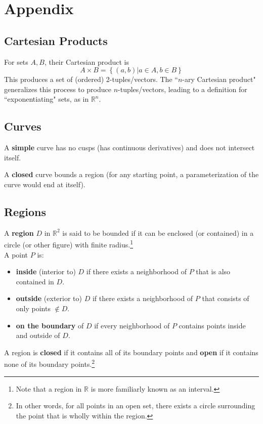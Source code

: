\documentclass{article}
\begin{document}
\section{Appendix}
\subsection{Cartesian Products} \label{set-multiplication}
For sets $A, B$, their Cartesian product is $$A \times B = \left\{ (a,b) | a \in A, b \in B\right\}$$
This produces a set of (ordered) 2-tuples/vectors.
The ``$n$-ary Cartesian product" generalizes this process to produce $n$-tuples/vectors, leading to a definition for ``exponentiating" sets, as in $\mathbb{R}^n$.

\subsection{Curves}
A \textbf{simple} curve has no cusps (has continuous derivatives) and does not intersect itself.

A \textbf{closed} curve bounds a region (for any starting point, a parameterization of the curve would end at itself).

\subsection{Regions} \label{regions}
A \textbf{region} $D$ in $\mathbb{R}^2$ is said to be bounded if it can be enclosed (or contained) in a circle (or other figure) with finite radius.\footnote{Note that a region in $\mathbb{R}$ is more familiarly known as an interval.}\\
A point $P$ is:
\begin{itemize}
    \item \textbf{inside} (interior to) $D$ if there exists a neighborhood of $P$ that is also contained in $D$.
    \item \textbf{outside} (exterior to) $D$ if there exists a neighborhood of $P$ that consists of only points $\notin D$.
    \item \textbf{on the boundary} of $D$ if every neighborhood of $P$ contains points inside and outside of $D$.
\end{itemize}
A region is \textbf{closed} if it contains all of its boundary points and \textbf{open} if it contains none of its boundary points.\footnote{In other words, for all points in an open set, there exists a circle surrounding the point that is wholly within the region.}
\end{document}
